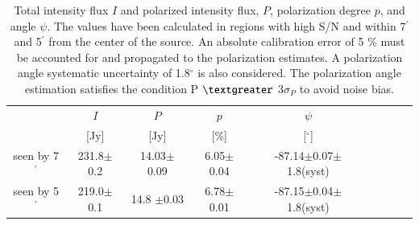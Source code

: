 \documentclass[twocolumn,traditabstract]{aa}
\begin{document}
\begin{table}
  \centering
      \begin{tabular}{ccccccccc}
      \hline
      \hline
       & $I$ & $P$ & $p$ & $\psi$  \\ 
                                         & [Jy]         &    [Jy]         & [\%]  & [$^\circ$] \\
      \hline
      \hline
   seen by 7$^{\prime}$   & 231.8$\pm$0.2  & 14.03$\pm$0.09 & 6.05$\pm$0.04 & -87.14$\pm$0.07$\pm$1.8(syst)  \\ 
 
          seen by 5$^{\prime}$ & 219.0$\pm$0.1  & 14.8 $\pm$0.03 & 6.78$\pm$0.01 & -87.15$\pm$0.04$\pm$1.8(syst)    \\ 
     	      
              
             
                \hline            
    \hline   
    \end{tabular}
   \caption{ Total intensity flux $I$ and  polarized intensity flux, $P$, polarization degree $p$, and angle $\psi$. The values have been calculated in regions with high S/N and within 7$^{\prime}$ and 5$^{\prime}$ from the center of the source. An absolute calibration error of 5 $\%$ must be accounted for and propagated to the polarization estimates. A polarization angle systematic uncertainty of 1.8$^{\circ}$ is also considered.
   The polarization angle estimation satisfies the condition P $\textgreater$ 3$\sigma_P$ to avoid noise bias. 
    }
    \label{tab:crab_results}
 \end{table}
  
\end{document}
